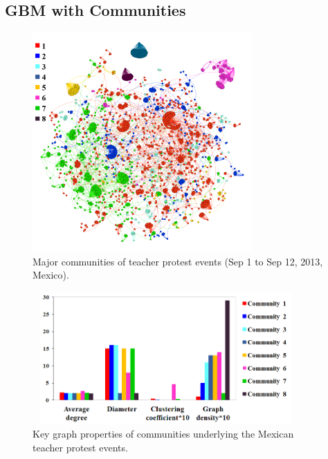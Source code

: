 \subsection{GBM with Communities}
\begin{figure}[t]
\centering
\includegraphics[width=3.3in] {figures/4_teacher_major_community.png}
\caption{Major communities of teacher protest events (Sep 1 to Sep 12, 2013,
Mexico).}
\label{fig:teacher_major_community}
\end{figure}


\begin{figure}[t]
\centering
\includegraphics[width=4in, height=2in] {figures/4teacher-community-parameters.png}
\vspace{-4mm}
\caption{Key graph properties of communities underlying the Mexican teacher protest events.}
\label{fig:teacher_community_parameters0}
\vspace{-4mm}
\end{figure}

